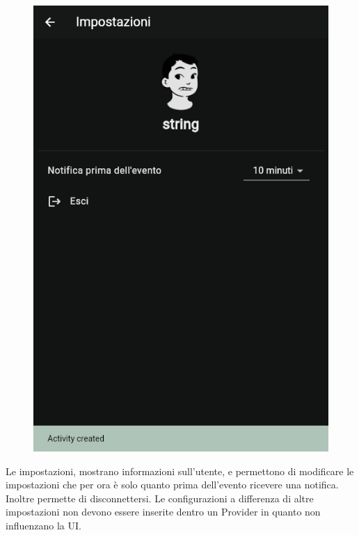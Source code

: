 \documentclass[a4paper,12pt]{article}
\begin{document}
\begin{figure}
    \vspace{-26pt}
    \center
    \includegraphics[width=0.5\linewidth]{img/settings.png}
\end{figure}
Le impostazioni, mostrano informazioni sull'utente, e permettono di modificare le impostazioni che per ora è solo quanto prima dell'evento ricevere una notifica. Inoltre permette di disconnettersi.
Le configurazioni a differenza di altre impostazioni non devono essere inserite dentro un Provider in quanto non influenzano la UI.

\newpage

\subsection{}
\end{document}
